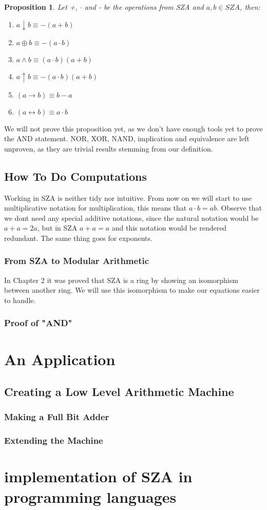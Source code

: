 \documentclass[12pt]{report}
\newtheorem{proposition}{Proposition}[section]
\theoremstyle{definition}
\theoremstyle{remark}
\begin{document}
      \begin{proposition}
        Let +, $\cdot$ and - be the operations from SZA and $a,b\in SZA$, then:
        \begin{enumerate}
          \item $a\downarrow b\equiv -(a+b)$
          \item $a\oplus b\equiv -(a\cdot b)$
          \item $a\wedge b\equiv (a\cdot b)(a+b)$
          \item $a\uparrow b\equiv -(a\cdot b)(a+b)$
          \item $(a\rightarrow b)\equiv b-a$
          \item $(a\leftrightarrow b)\equiv a\cdot b$
        \end{enumerate}
      \end{proposition}

      We will not prove this proposition yet, as we don't have enough tools yet to prove the AND statement. NOR, XOR, NAND, implication and equivalence are left unproven, as they are trivial results stemming from our definition.

  \section{How To Do Computations}
    Working in SZA is neither tidy nor intuitive. From now on we will start to use multiplicative notation for multiplication, this means that $a\cdot b = ab$. Observe that we dont need any special additive notations, since the natural notation would be $a+a=2a$, but in SZA $a+a=a$ and this notation would be rendered redundant. The same thing goes for exponents.
    \subsection{From SZA to Modular Arithmetic}
      In Chapter 2 it was proved that SZA is a ring by showing an isomorphism between another ring. We will use this isomorphism to make our equations easier to handle.
    \subsection{Proof of "AND"}

\newpage

\chapter{An Application}
  \section{Creating a Low Level Arithmetic Machine}
    \subsection{Making a Full Bit Adder}

    \subsection{Extending the Machine}

\newpage

\chapter{implementation of SZA in programming languages}
\end{document}
